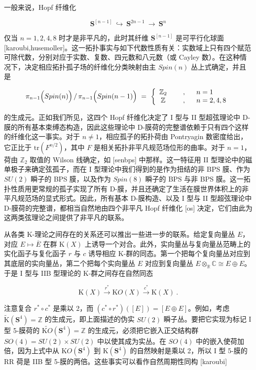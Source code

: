 \documentclass[11pt,a4paper]{ctexart}
\begin{document}
一般来说，Hopf 纤维化

\[{\mathbf S}^[n-1]~\hookrightarrow~{\mathbf S}^{2n-1}~\longrightarrow~{\mathbf S}^n\]

仅当 \(n=1,2,4,8\) 时才是非平凡的，此时其纤维 \({\mathbf S}^[n-1]\) 是可平行化球面 [karoubi,husemoller]。这一拓扑事实与如下代数性质有关：实数域上只有四个赋范可除代数，分别对应于实数、复数、四元数和八元数（或 Cayley 数）。在这种情况下，决定相应拓扑孤子场的纤维化分类映射由主 \(Spin(n)\) 丛上式确定，并且是

\[\pi_{n-1}\Bigl(Spin(n)\Bigr)\,/\,\pi_{n-1}\Bigl(Spin(n-1)\Bigr)~
=~\left\{\begin{array}{cll}{\mathbb{Z}}_2~~~~&,&~~n=1\\{\mathbb{Z}}~~~~&,
&~~n=2,4,8\end{array}\right.\]

的生成元。正如我们所见，这四个 Hopf 纤维化决定了 I 型与 II 型超弦理论中 D-膜的所有基本束缚态构造，因此这些理论中 D-膜荷的完整谱依赖于只有四个这样的纤维化这一事实。对于 \(n\neq 1\)，相应孤子的拓扑荷由 Pontryagin 数密度给出，它正比于 \(\mathrm{tr}(F^{n/2})\)，其中 \(F\) 是相关拓扑非平凡规范场位形的曲率。对于 \(n=1\)，荷由 \({\mathbb{Z}}_2\) 取值的 Wilson 线确定，如 [senbps] 中那样。这一特征用 II 型理论中的磁单极子来确定弦孤子，而在 I 型理论中我们得到的是作为扭结的非 BPS 膜、作为 \(SU(2)\) 瞬子的 BPS 膜，以及作为 \(Spin(8)\) 瞬子的 BPS 与非 BPS 膜。这一拓扑性质用更常规的孤子实现了所有 D-膜，并且还确定了生活在膜世界体积上的非平凡规范场的显式形式。因此，所有基本 D-膜构造、以及 I 型与 II 型超弦理论中 D-膜荷的完整谱，都相当自然地由四个非平凡 Hopf 纤维化 [os] 决定，它们由此为这两类弦理论之间提供了非平凡的联系。

从各类 K-理论之间存在的关系还可以推出一些进一步的联系。给定复向量丛 \(E\)，对应 \(E\mapsto\overline{E}\) 在群 \({\mathrm K}(X)\) 上诱导一个对合。此外，实向量丛与复向量丛范畴上的实化函子与复化函子 \(r\) 与 \(c\) 诱导相应 K-群的同态。第一个把每个复向量丛对应到其底层的实向量丛，第二个把每个实向量丛 \(E\) 对应到复向量丛 \(E\otimes_{{\mathbb{R}}}{\mathbb{C}}\cong E\oplus E\)。于是 I 型与 IIB 型理论的 K-群之间存在自然同态

\[{\mathrm K}(X)\stackrel{r^*}{\longrightarrow}{\mathrm KO}(X)\stackrel{c^*}{\longrightarrow}
{\mathrm K}(X)\ .\]

注意复合 \(r^*\circ c^*\) 是乘以 2，而 \((c^*\circ r^*)([E])=[E\oplus E]\)。例如，考虑 \(\widetilde{{\mathrm K}}({\mathbf S}^4)={\mathbb{Z}}\) 的生成元，即上面描述的伪实 \(SU(2)\) 瞬子丛。要把它实现为标记 I 型 5-膜荷的 \(\widetilde{{\mathrm KO}}({\mathbf S}^4)={\mathbb{Z}}\) 的生成元，必须把它嵌入正交结构群 \(SO(4)=SU(2)\times SU(2)\) 中以使其成为实丛。在 \(SO(4)\) 中的嵌入使荷加倍，因为上式中从 \({\mathrm KO}({\mathbf S}^4)\) 到 \({\mathrm K}({\mathbf S}^4)\) 的自然映射是乘以 2，所以 I 型 5-膜的 RR 荷是 IIB 型 5-膜的两倍。这些事实可以看作自然周期性同构 [karoubi]
\end{document}
